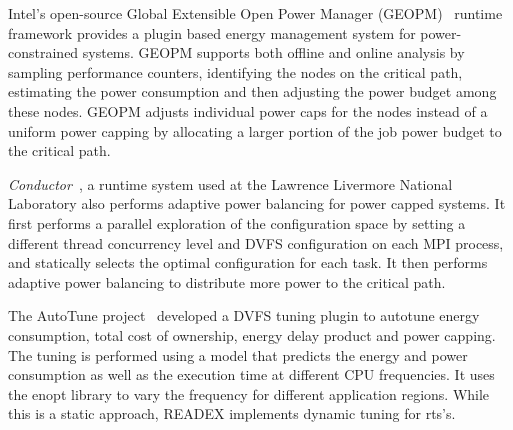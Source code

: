 Intel's open-source Global Extensible Open Power Manager (GEOPM)~\cite{geopm} runtime framework provides a plugin based energy management system for power-constrained systems. GEOPM supports both offline and online analysis by sampling performance counters, identifying the nodes on the critical path, estimating the power consumption and then adjusting the power budget among these nodes. GEOPM adjusts individual power caps for the nodes instead of a uniform power capping by allocating a larger portion of the job power budget to the critical path. 
	
\textit{Conductor}~\cite{Marathe}, a runtime system used at the Lawrence Livermore National Laboratory also performs adaptive power balancing for power capped systems. It first performs a parallel exploration of the configuration space by setting a different thread concurrency level and DVFS configuration on each MPI process, and statically selects the optimal configuration for each task. It then performs adaptive power balancing to distribute more power to the critical path.

The AutoTune project~\cite{guillen2016dvfs,AutoTune:Book2015} developed a DVFS tuning plugin to autotune energy consumption, total cost of ownership, energy delay product and power capping. The tuning is performed using a model that predicts the energy and power consumption as well as the execution time at different CPU frequencies. It uses the enopt library to vary the frequency for different application regions. While this is a static approach, READEX implements dynamic tuning for rts's.

